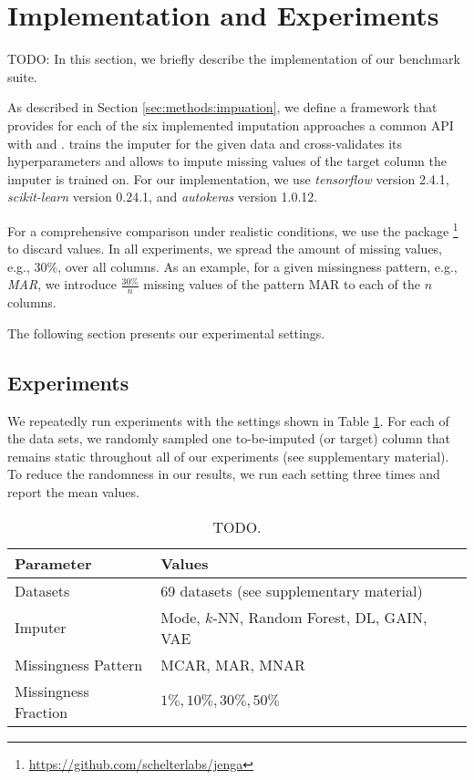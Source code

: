 
\section{Implementation and Experiments}
%
TODO: In this section, we briefly describe the implementation of our benchmark suite.

As described in Section \ref{sec:methods:impuation}, we define a framework that provides for each of the six implemented imputation approaches a common API with  and .  trains the imputer for the given data and cross-validates its hyperparameters and  allows to impute missing values of the target column the imputer is trained on. For our implementation, we use \emph{tensorflow} version 2.4.1, \emph{scikit-learn} version 0.24.1, and \emph{autokeras} version 1.0.12.

For a comprehensive comparison under realistic conditions, we use the package \footnote{\url{https://github.com/schelterlabs/jenga}} \citep{Jenga} to discard values. In all experiments, we spread the amount of missing values, e.g., $30\%$, over all columns. As an example, for a given missingness pattern, e.g., \emph{MAR}, we introduce $\frac{30\%}{n}$ missing values of the pattern MAR to each of the $n$ columns.

The following section presents our experimental settings.


\subsection{Experiments}

We repeatedly run experiments with the settings shown in Table \ref{tab:experiment_settings}. For each of the data sets, we randomly sampled one to-be-imputed (or target) column that remains static throughout all of our experiments (see supplementary material). To reduce the randomness in our results, we run each setting three times and report the mean values.
%
\begin{table}[h!]
	\centering
	\begin{tabular}{ll}
		\toprule
		Parameter            & Values                                     \\ \midrule
		Datasets             & 69 datasets (see supplementary material)    \\
		Imputer              & Mode, $k$-NN, Random Forest, DL, GAIN, VAE \\
		Missingness Pattern  & MCAR, MAR, MNAR                            \\
		Missingness Fraction & $1\%, 10\%, 30\%, 50\%$                      \\ \bottomrule
	\end{tabular}
	\caption{TODO.}
	\label{tab:experiment_settings}
\end{table}
%

